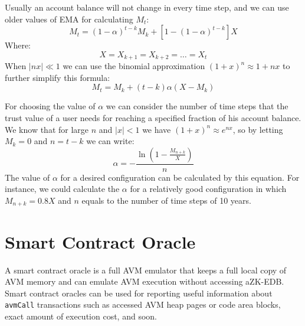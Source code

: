 \documentclass[11pt, A4]{article}
\begin{document}
    Usually an account balance will not change in every time step, and we can use older values of EMA for calculating
    \(M_t\):
    \[
        M_t = (1 - \alpha)^{t-k}M_k + [1 - (1 - \alpha)^{t - k}]X
    \]
    Where:
    \[
        X = X_{k+1} = X_{k+2} = \dots = X_t
    \]
    When \(|nx| \ll 1\) we can use the binomial approximation  \((1 + x)^n \approx 1 + nx\) to further simplify this
    formula:
    \[
        M_t = M_k + (t - k) \alpha (X - M_k)
    \]

    For choosing the value of \(\alpha\) we can consider the number of time steps that the trust value of a user needs
    for reaching a specified fraction of his account balance.
    We know that for large \(n\) and \(|x| < 1\) we have \((1 + x)^n \approx e^{nx}\), so by letting \(M_k = 0\) and
    \(n = t - k\)
    we can write:
    \[
        \alpha =- \frac{\ln\left(1 - \frac{M_{n+k}}{X}\right)}{n}
    \]
    The value of \(\alpha\) for a desired configuration can be calculated by this equation.
    For instance, we could calculate the \(\alpha\) for a relatively good configuration in which \(M_{n+k} = 0.8X\)
    and \(n\) equals to the number of time steps of 10 years.


    \section{Smart Contract Oracle}\label{sec:smart-contract-oracle}

    A smart contract oracle is a full AVM emulator that keeps a full local copy of AVM memory and can emulate AVM
    execution without accessing aZK-EDB. Smart contract oracles can be used for reporting useful information about
    \texttt{avmCall} transactions such as accessed AVM heap pages or code area blocks, exact amount of execution cost,
    and soon.
\end{document}
